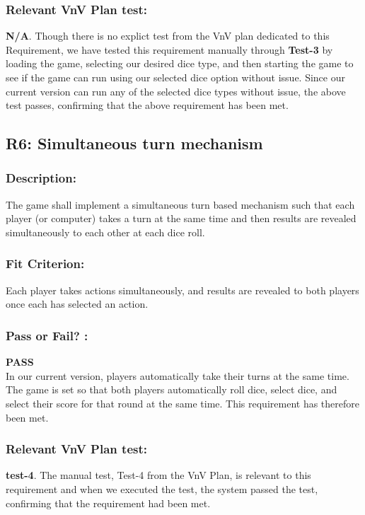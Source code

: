 \documentclass[12pt, titlepage]{article}
\begin{document}
\subsubsection*{Relevant VnV Plan test: } \textbf{N/A}. Though there is no explict test from the VnV plan dedicated to this Requirement, we have tested this requirement manually through \textbf{Test-3} by loading the game, selecting our desired dice type, and then starting the game to see if the game can run using our selected dice option without issue. Since our current version can run any of the selected dice types without issue, the above test passes, confirming that the above requirement has been met.


\subsection{R6: Simultaneous turn mechanism} 
\label{R6} 

\subsubsection*{Description:}The game shall implement a simultaneous turn based mechanism such that each player (or computer) takes a turn at the same time and then results are revealed simultaneously to each other at each dice roll.

\subsubsection*{Fit Criterion:} Each player takes actions simultaneously, and results are revealed to both players once each has selected an action.

\subsubsection*{Pass or Fail? :} 

 \noindent \textbf{PASS}\\
 
  In our current version, players automatically take their turns at the same time. The game is set so that both players automatically roll dice, select dice, and select their score for that round at the same time. This requirement has therefore been met.

\subsubsection*{Relevant VnV Plan test: } \textbf{test-4}.  The manual test, Test-4 from the VnV Plan, is relevant to this requirement and when we executed the test, the system passed the test, confirming that the requirement had been met.
\end{document}
